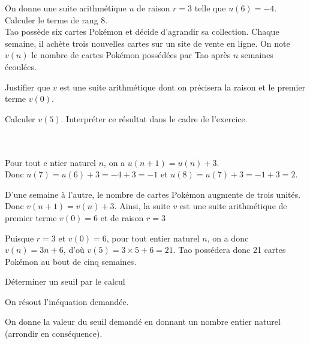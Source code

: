 \begin{bexemple}
	 On donne une suite arithmétique $u$ de raison $r=3$ telle que $u(6)=-4$. Calculer le terme de rang 8.\\
	 Tao possède six cartes Pokémon et décide d'agrandir sa collection. Chaque semaine, il achète trois nouvelles cartes sur un site de vente en ligne.
	On note $v(n)$ le nombre de cartes Pokémon possédées par Tao après $n$ semaines écoulées.
	\begin{enumEx}
		\item Justifier que $v$ est une suite arithmétique dont on précisera la raison et le premier terme $v(0)$.
		\item Calculer $v(5)$. Interpréter ce résultat dans le cadre de l'exercice.
	\end{enumEx}
	\ \\
	\\
	  Pour tout e ntier naturel $n$, on a $u(n+1)=u(n)+3$.\\
	Donc $u(7)=u(6)+3=-4+3=-1$ et $u(8)=u(7)+3=-1+3=2$.\\
	\begin{enumEx}
		\item D'une semaine à l'autre, le nombre de cartes Pokémon augmente de trois unités. Donc $v(n+1)=v(n)+3$. Ainsi, la suite $v$ est une suite arithmétique de premier terme $v(0)=6$ et de raison $r=3$
		\item Puisque $r=3$ et $v(0)=6$, pour tout entier naturel $n$, on a donc $v(n)=3 n+6$, d'où $v(5)=3 \times 5+6=21$.
		Tao possédera donc 21 cartes Pokémon au bout de cinq semaines.
	\end{enumEx}
\end{bexemple}

\begin{bmethodet}{Déterminer un seuil par le calcul}
	\begin{itemMet}
		\item On résout l'inéquation demandée.
		\item On donne la valeur du seuil demandé en donnant un nombre entier naturel (arrondir en conséquence).
	\end{itemMet}
\end{bmethodet}

